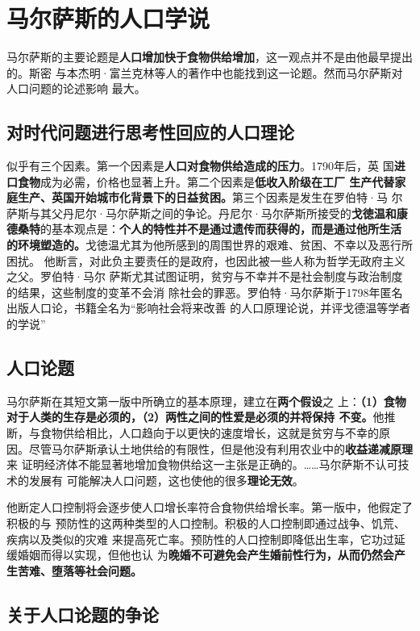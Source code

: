 \section{马尔萨斯的人口学说}

马尔萨斯的主要论题是\textbf{人口增加快于食物供给增加}，这一观点并不是由他最早提出的。斯密
与本杰明·富兰克林等人的著作中也能找到这一论题。然而马尔萨斯对人口问题的论述影响
最大。

\subsection{对时代问题进行思考性回应的人口理论}

似乎有三个因素。第一个因素是\textbf{人口对食物供给造成的压力}。1790年后，英
国\textbf{进口食物}成为必需，价格也显著上升。第二个因素是\textbf{低收入阶级在工厂
  生产代替家庭生产、英国开始城市化背景下的日益贫困。}第三个因素是发生在罗伯特·马
尔萨斯与其父丹尼尔·马尔萨斯之间的争论。丹尼尔·马尔萨斯所接受的\textbf{戈徳温和康
  德桑特}的基本观点是：\textbf{个人的特性并不是通过遗传而获得的，而是通过他所生活
  的环境塑造的。}戈徳温尤其为他所感到的周围世界的艰难、贫困、不幸以及恶行所困扰。
他断言，对此负主要责任的是政府，也因此被一些人称为哲学无政府主义之父。罗伯特·马尔
萨斯尤其试图证明，贫穷与不幸并不是社会制度与政治制度的结果，这些制度的变革不会消
除社会的罪恶。罗伯特·马尔萨斯于1798年匿名出版人口论，书籍全名为“影响社会将来改善
的人口原理论说，并评戈德温等学者的学说”

\subsection{人口论题}

马尔萨斯在其短文第一版中所确立的基本原理，建立在\textbf{两个假设}之
上：\textbf{（1）食物对于人类的生存是必须的，（2）两性之间的性爱是必须的并将保持
  不变。}他推断，与食物供给相比，人口趋向于以更快的速度增长，这就是贫穷与不幸的原
因。尽管马尔萨斯承认土地供给的有限性，但是他没有利用农业中的\textbf{收益递减原理}来
证明经济体不能显著地增加食物供给这一主张是正确的。……马尔萨斯不认可技术的发展有
可能解决人口问题，这也使他的很多\textbf{理论无效}。

他断定人口控制将会逐步使人口增长率符合食物供给增长率。第一版中，他假定了积极的与
预防性的这两种类型的人口控制。积极的人口控制即通过战争、饥荒、疾病以及类似的灾难
来提高死亡率。预防性的人口控制即降低出生率，它功过延缓婚姻而得以实现，但他也认
为\textbf{晚婚不可避免会产生婚前性行为，从而仍然会产生苦难、堕落等社会问题。}

\subsection{关于人口论题的争论}


